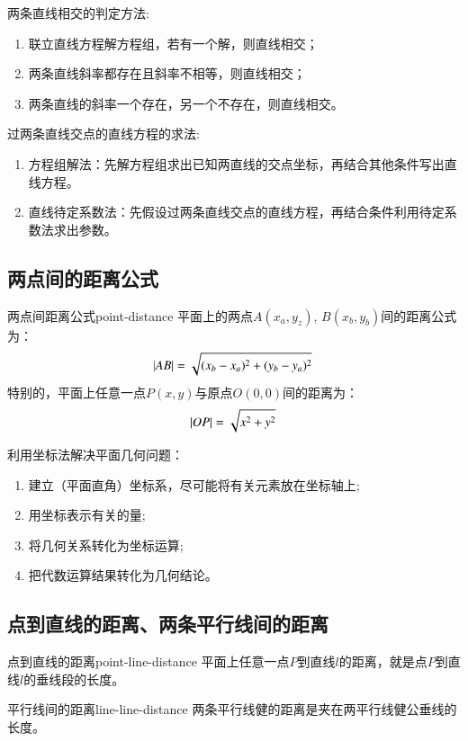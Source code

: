 \begin{note}
   两条直线相交的判定方法:
   \begin{enumerate}
       \item 联立直线方程解方程组，若有一个解，则直线相交；
       \item 两条直线斜率都存在且斜率不相等，则直线相交；
       \item 两条直线的斜率一个存在，另一个不存在，则直线相交。
   \end{enumerate} 
\end{note}

\begin{note}
   过两条直线交点的直线方程的求法:
   \begin{enumerate}
       \item 方程组解法：先解方程组求出已知两直线的交点坐标，再结合其他条件写出直线方程。
       \item 直线待定系数法：先假设过两条直线交点的直线方程，再结合条件利用待定系数法求出参数。
   \end{enumerate} 
\end{note}

\subsection{两点间的距离公式}

\begin{definition}{两点间距离公式}{point-distance}
平面上的两点$A(x_a, y_z)$, $B(x_b, y_b)$间的距离公式为：
\begin{equation}
    \abs{AB} = \sqrt{(x_b - x_a)^2 + (y_b - y_a)^2}
\end{equation}
特别的，平面上任意一点$P(x, y)$与原点$O(0,0)$间的距离为：
\begin{equation}
    \abs{OP} = \sqrt{x^2+y^2}
\end{equation}
\end{definition}

\begin{note}
利用坐标法解决平面几何问题：
\begin{enumerate}
    \item 建立（平面直角）坐标系，尽可能将有关元素放在坐标轴上;
    \item 用坐标表示有关的量;
    \item 将几何关系转化为坐标运算;
    \item 把代数运算结果转化为几何结论。
\end{enumerate}
\end{note}

\subsection{点到直线的距离、两条平行线间的距离}

\begin{definition}{点到直线的距离}{point-line-distance}
平面上任意一点$P$到直线$l$的距离，就是点$P$到直线$l$的垂线段的长度。
\end{definition}

\begin{definition}{平行线间的距离}{line-line-distance}
两条平行线健的距离是夹在两平行线健公垂线的长度。
\end{definition}

\newpage
\begin{problemset}
\end{problemset}